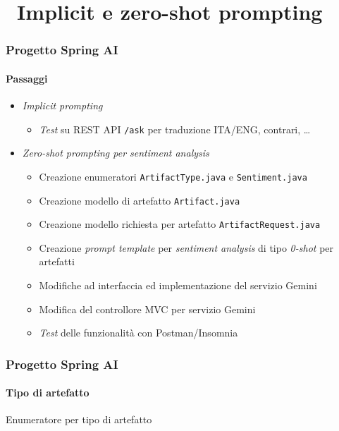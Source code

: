 \section{\faWrench\ Implicit e zero-shot prompting} %
\label{sec:spring-ai-gemini-implicit-zero-shot-prompting}
%
\begin{frame}[t,fragile] \frametitle{Progetto Spring AI}
    \framesubtitle{Passaggi}
    {\small
        \begin{itemize}[leftmargin=10pt,align=right]
            \item[\alert{\faArrowCircleRight}] \textit{Implicit prompting}
            \begin{itemize}[leftmargin=10pt,align=right]
                \item[\alertedcircled{1}] \textit{Test} su REST API \texttt{/ask} per traduzione ITA/ENG, contrari, \ldots
            \end{itemize}
            \item[\alert{\faArrowCircleRight}] \textit{\textit{Zero-shot prompting} per \textit{sentiment analysis}}
            \begin{itemize}[leftmargin=10pt,align=right]
                \item[\alertedcircled{1}] Creazione enumeratori \texttt{ArtifactType.java} e \texttt{Sentiment.java}
                \item[\alertedcircled{2}] Creazione modello di artefatto \texttt{Artifact.java}
                \item[\alertedcircled{3}] Creazione modello richiesta per artefatto \texttt{ArtifactRequest.java}
                \item[\alertedcircled{4}] Creazione \textit{prompt template} per \textit{sentiment analysis} di tipo \textit{0-shot} per artefatti
                \item[\alertedcircled{5}] Modifiche ad interfaccia ed implementazione del servizio Gemini
                \item[\alertedcircled{6}] Modifica del controllore MVC per servizio Gemini
                \item[\alertedcircled{7}] \textit{Test} delle funzionalità con Postman/Insomnia
            \end{itemize}
        \end{itemize}
    }
\end{frame}
%
\begin{frame}[t,fragile] \frametitle{Progetto Spring AI}
    \framesubtitle{Tipo di artefatto}
        \begin{block}{Enumeratore per tipo di artefatto}
			{\tiny}
    	\end{block}
\end{frame}
